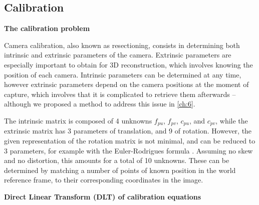 \FloatBarrier
\subsection{Calibration}

\noindent\textbf{The calibration problem}

Camera calibration, also known as resectioning, consists in determining both intrinsic and extrinsic parameters of the camera. Extrinsic parameters are especially important to obtain for 3D reconstruction, which involves knowing the position of each camera. Intrinsic parameters can be determined at any time, however extrinsic parameters depend on the camera positions at the moment of capture, which involves that it is complicated to retrieve them afterwards -- although we proposed a method to address this issue in \autoref{ch:6}.

The intrinsic matrix is composed of 4 unknowns $f_{pu}$, $f_{pv}$, $c_{pu}$, and $c_{pv}$, while the extrinsic matrix has 3 parameters of translation, and 9 of rotation. However, the given representation of the rotation matrix is not minimal, and can be reduced to 3 parameters, for example with the Euler-Rodrigues formula \cite{Gallego2015}. Assuming no skew and no distortion, this amounts for a total of 10 unknowns. These can be determined by matching a number of points of known position in the world reference frame, to their corresponding coordinates in the image. 

\vspace*{0.5cm}
\noindent\textbf{Direct Linear Transform (DLT) of calibration equations}

